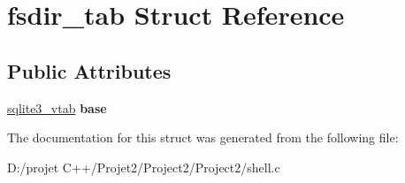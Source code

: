 \hypertarget{structfsdir__tab}{}\section{fsdir\+\_\+tab Struct Reference}
\label{structfsdir__tab}
\subsection*{Public Attributes}
\begin{DoxyCompactItemize}
\item 
\mbox{\label{structfsdir__tab_a42458abc77fffd18d9c9c79086e06a60}} 
\mbox{\hyperlink{structsqlite3__vtab}{sqlite3\+\_\+vtab}} {\bfseries base}
\end{DoxyCompactItemize}


The documentation for this struct was generated from the following file\+:\begin{DoxyCompactItemize}
\item 
D\+:/projet C++/\+Projet2/\+Project2/\+Project2/shell.\+c\end{DoxyCompactItemize}
